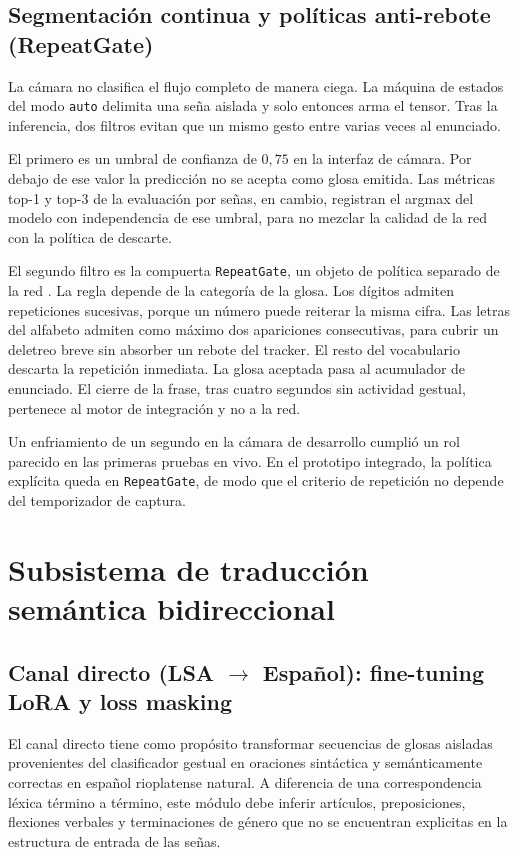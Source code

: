 \subsection{Segmentación continua y políticas anti-rebote (RepeatGate)}

La cámara no clasifica el flujo completo de manera ciega. La máquina de estados del modo \texttt{auto} delimita una seña aislada y solo entonces arma el tensor. Tras la inferencia, dos filtros evitan que un mismo gesto entre varias veces al enunciado.

El primero es un umbral de confianza de $0{,}75$ en la interfaz de cámara. Por debajo de ese valor la predicción no se acepta como glosa emitida. Las métricas top-1 y top-3 de la evaluación por señas, en cambio, registran el argmax del modelo con independencia de ese umbral, para no mezclar la calidad de la red con la política de descarte.

El segundo filtro es la compuerta \texttt{RepeatGate}, un objeto de política separado de la red \parencite{gamma1994design}. La regla depende de la categoría de la glosa. Los dígitos admiten repeticiones sucesivas, porque un número puede reiterar la misma cifra. Las letras del alfabeto admiten como máximo dos apariciones consecutivas, para cubrir un deletreo breve sin absorber un rebote del tracker. El resto del vocabulario descarta la repetición inmediata. La glosa aceptada pasa al acumulador de enunciado. El cierre de la frase, tras cuatro segundos sin actividad gestual, pertenece al motor de integración y no a la red.

Un enfriamiento de un segundo en la cámara de desarrollo cumplió un rol parecido en las primeras pruebas en vivo. En el prototipo integrado, la política explícita queda en \texttt{RepeatGate}, de modo que el criterio de repetición no depende del temporizador de captura.

\section{Subsistema de traducción semántica bidireccional}
\subsection{Canal directo (\texorpdfstring{LSA $\rightarrow$ Español}{LSA -> Español}): fine-tuning LoRA y loss masking}

El canal directo tiene como propósito transformar secuencias de glosas aisladas provenientes del clasificador gestual en oraciones sintáctica y semánticamente correctas en español rioplatense natural. A diferencia de una correspondencia léxica término a término, este módulo debe inferir artículos, preposiciones, flexiones verbales y terminaciones de género que no se encuentran explicitas en la estructura de entrada de las señas.

